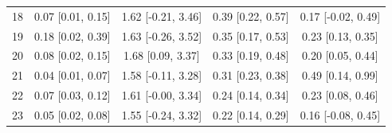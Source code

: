 \begin{table}
{\begin{tabular}{lcccc}
18 & 0.07 [0.01, 0.15] & 1.62 [-0.21, 3.46] & 0.39 [0.22, 0.57] & 0.17 [-0.02, 0.49] \\
19 & 0.18 [0.02, 0.39] & 1.63 [-0.26, 3.52] & 0.35 [0.17, 0.53] & 0.23 [0.13, 0.35] \\
20 & 0.08 [0.02, 0.15] & 1.68 [0.09, 3.37] & 0.33 [0.19, 0.48] & 0.20 [0.05, 0.44] \\
21 & 0.04 [0.01, 0.07] & 1.58 [-0.11, 3.28] & 0.31 [0.23, 0.38] & 0.49 [0.14, 0.99] \\
22 & 0.07 [0.03, 0.12] & 1.61 [-0.00, 3.34] & 0.24 [0.14, 0.34] & 0.23 [0.08, 0.46] \\
23 & 0.05 [0.02, 0.08] & 1.55 [-0.24, 3.32] & 0.22 [0.14, 0.29] & 0.16 [-0.08, 0.45] \\
\bottomrule
\end{tabular}
}
\end{table}